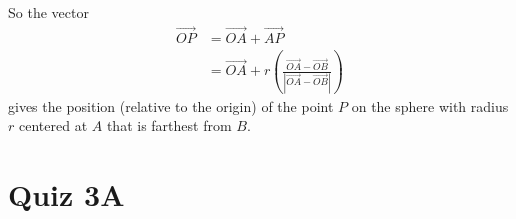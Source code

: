 \documentclass{ximera}
\begin{document}
\begin{question}
\begin{explanation}
So the vector
\begin{align*}
   \overrightarrow{OP} &= \overrightarrow{OA} +\overrightarrow{AP} \\
                                 &= \overrightarrow{OA} +  r \left( \frac{\overrightarrow{OA} - \overrightarrow{OB}}{|\overrightarrow{OA} - \overrightarrow{OB}|}  \right)
\end{align*}
gives the position (relative to the origin) of the point  $P$ on the sphere with radius $r$ centered at $A$ that is farthest from $B$.

\end{explanation}
\end{question}

\section{Quiz 3A}
\end{document}
